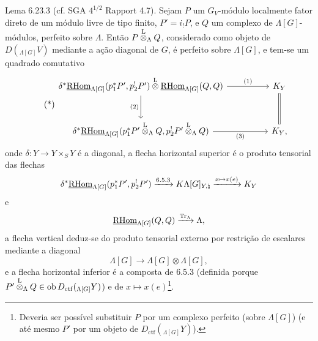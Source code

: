 \begin{statement}{Lema 6.23.3}
(cf. SGA $4^{1/2}$ Rapport 4.7). Sejam $P$ um $G_V$-módulo localmente fator direto de um módulo livre de tipo finito, $P'=i_!P$, e $Q$ um complexo de $\Lambda[G]$-módulos, perfeito sobre $\Lambda$. Então $P\overset{\mathrm L}{\otimes}_{\Lambda}Q$, considerado como objeto de $D({}_{\Lambda[G]}V)$ mediante a ação diagonal de $G$, é perfeito sobre $\Lambda[G]$, e tem-se um quadrado comutativo
\begin{equation}
\tag{*}
\begin{tikzcd}[column sep=huge,row sep=large]
\delta^*\uRHom_{\Lambda[G]}(p_1^*P',p_2^!P')\lten
\uRHom_{\Lambda[G]}(Q,Q) \arrow[r,"(1)"] \arrow[d,"(2)"']
& K_Y \arrow[d,equal]\\
\delta^*\uRHom_{\Lambda[G]}(p_1^*P'\lten_{\Lambda}Q,p_2^!P'\lten_{\Lambda}Q) \arrow[r,"(3)"']
& K_Y ,
\end{tikzcd}
\end{equation}
onde $\delta:Y\to Y\times_SY$ é a diagonal, a flecha horizontal superior é o produto tensorial das flechas
\[
\delta^*\underline{\mathrm{RHom}}_{\Lambda[G]}(p_1^*P',p_2^!P')\xrightarrow{6.5.3}
K\Lambda[G]_{Y,\natural}\xrightarrow{x\mapsto x(e)}K_Y
\]
e
\[
\underline{\mathrm{RHom}}_{\Lambda[G]}(Q,Q)\xrightarrow{\operatorname{Tr}_{\Lambda}}\Lambda,
\]
a flecha vertical deduz-se do produto tensorial externo por restrição de escalares mediante a diagonal
\[
\Lambda[G]\to\Lambda[G]\otimes\Lambda[G],
\]
e a flecha horizontal inferior é a composta de 6.5.3 (definida porque $P'\overset{\mathrm L}{\otimes}_{\Lambda}Q\in\operatorname{ob} D_{\mathrm{ctf}}({}_{\Lambda[G]}Y)$) e de $x\mapsto x(e)$\footnote{Deveria ser possível substituir $P$ por um complexo perfeito (sobre $\Lambda[G]$) (e até mesmo $P'$ por um objeto de $D_{\mathrm{ctf}}({}_{\Lambda[G]}Y)$).}.
\end{statement}

